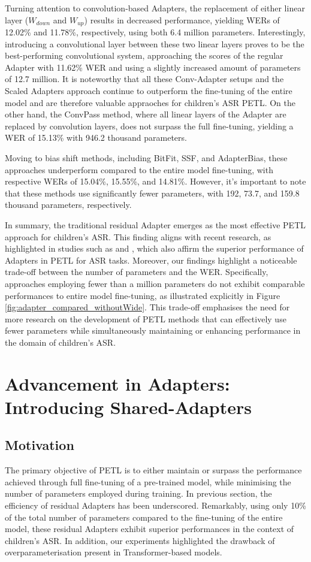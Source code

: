 Turning attention to convolution-based Adapters, the replacement of either linear layer ($W_{down}$ and $W_{up}$) results in decreased performance, yielding WERs of 12.02\% and 11.78\%, respectively, using both 6.4 million parameters. Interestingly, introducing a convolutional layer between these two linear layers proves to be the best-performing convolutional system, approaching the scores of the regular Adapter with 11.62\% WER and using a slightly increased amount of parameters of 12.7 million. It is noteworthy that all these Conv-Adapter setups and the Scaled Adapters approach continue to outperform the fine-tuning of the entire model and are therefore valuable appraoches for children's ASR PETL.
On the other hand, the ConvPass method, where all linear layers of the Adapter are replaced by convolution layers, does not surpass the full fine-tuning, yielding a WER of 15.13\% with 946.2 thousand parameters.

Moving to bias shift methods, including BitFit, SSF, and AdapterBias, these approaches underperform compared to the entire model fine-tuning, with respective WERs of 15.04\%, 15.55\%, and 14.81\%. However, it's important to note that these methods use significantly fewer parameters, with 192, 73.7, and 159.8 thousand parameters, respectively.

In summary, the traditional residual Adapter emerges as the most effective PETL approach for children's ASR. This finding aligns with recent research, as highlighted in studies such as \cite{li2023evaluating} and \cite{cappellazzo2023parameter}, which also affirm the superior performance of Adapters in PETL for ASR tasks. Moreover, our findings highlight a noticeable trade-off between the number of parameters and the WER. Specifically, approaches employing fewer than a million parameters do not exhibit comparable performances to entire model fine-tuning, as illustrated explicitly in Figure \ref{fig:adapter_compared_withoutWide}. This trade-off emphasises the need for more research on the development of PETL methods that can effectively use fewer parameters while simultaneously maintaining or enhancing performance in the domain of children's ASR.

\section{Advancement in Adapters: Introducing Shared-Adapters}
\subsection{Motivation}
The primary objective of PETL is to either maintain or surpass the performance achieved through full fine-tuning of a pre-trained model, while minimising the number of parameters employed during training. In previous section, the efficiency of residual Adapters has been underscored. Remarkably, using only 10\% of the total number of parameters compared to the fine-tuning of the entire model, these residual Adapters exhibit superior performances in the context of children's ASR. In addition, our experiments highlighted the drawback of overparameterisation present in Transformer-based models.

